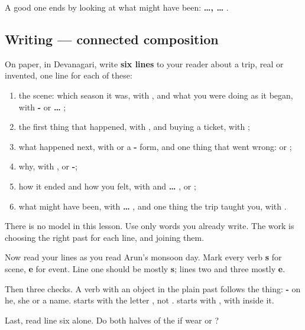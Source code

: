 A good one ends by looking at what might have been: \textbf{ …,   …  }.

\subsection*{Writing — connected composition}
On paper, in Devanagari, write \textbf{six lines} to your reader about a trip, real or invented, one line for each of these:

\begin{enumerate}
\raggedright
  \item the scene: which season it was, with \textbf{}, and what you were doing as it began, with \textbf{- } or \textbf{… };
  \item the first thing that happened, with \textbf{}, and buying a ticket, with \textbf{};
  \item what happened next, with \textbf{} or a \textbf{-} form, and one thing that went wrong: \textbf{} or \textbf{};
  \item why, with \textbf{}, \textbf{} or \textbf{-};
  \item how it ended and how you felt, with \textbf{} and \textbf{ … }, \textbf{} or \textbf{};
  \item what might have been, with \textbf{… }, and one thing the trip taught you, with \textbf{}.
\end{enumerate}

There is no model in this lesson. Use only words you already write. The work is choosing the right past for each line, and joining them.

\begin{tcolorbox}[breakable,colback=teal!4,colframe=teal!35!black,title={Before you move on}]
Now read your lines as you read Arun's monsoon day. Mark every verb \textbf{s} for scene, \textbf{e} for event. Line one should be mostly \textbf{s}; lines two and three mostly \textbf{e}.

Then three checks. A verb with an object in the plain past follows the thing: \textbf{-} on he, she or a name. \textbf{} starts with the letter \textbf{}, not \textbf{}. \textbf{} starts with \textbf{}, with \textbf{} inside it.

Last, read line six alone. Do both halves of the if wear \textbf{} or \textbf{}?
\end{tcolorbox}
